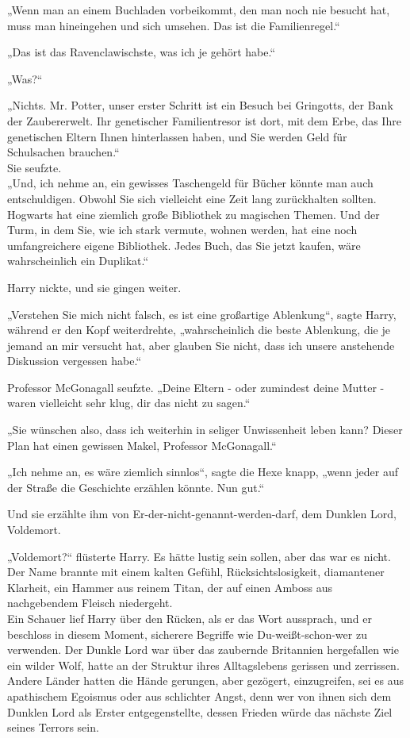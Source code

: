 {„Wenn man an einem Buchladen vorbeikommt, den man noch nie besucht hat, muss man hineingehen und sich umsehen. Das ist die Familienregel.“

„Das ist das Ravenclawischste, was ich je gehört habe.“

„Was?“

„Nichts. Mr. Potter, unser erster Schritt ist ein Besuch bei Gringotts, der Bank der Zaubererwelt. Ihr genetischer Familientresor ist dort, mit dem Erbe, das Ihre genetischen Eltern Ihnen hinterlassen haben, und Sie werden Geld für Schulsachen brauchen.“\\ Sie seufzte.\\ „Und, ich nehme an, ein gewisses Taschengeld für Bücher könnte man auch entschuldigen. Obwohl Sie sich vielleicht eine Zeit lang zurückhalten sollten. Hogwarts hat eine ziemlich große Bibliothek zu magischen Themen. Und der Turm, in dem Sie, wie ich stark vermute, wohnen werden, hat eine noch umfangreichere eigene Bibliothek. Jedes Buch, das Sie jetzt kaufen, wäre wahrscheinlich ein Duplikat.“

Harry nickte, und sie gingen weiter.

„Verstehen Sie mich nicht falsch, es ist eine großartige Ablenkung“, sagte Harry, während er den Kopf weiterdrehte, „wahrscheinlich die beste Ablenkung, die je jemand an mir versucht hat, aber glauben Sie nicht, dass ich unsere anstehende Diskussion vergessen habe.“

Professor McGonagall seufzte. „Deine Eltern - oder zumindest deine Mutter - waren vielleicht sehr klug, dir das nicht zu sagen.“

„Sie wünschen also, dass ich weiterhin in seliger Unwissenheit leben kann? Dieser Plan hat einen gewissen Makel, Professor McGonagall.“

„Ich nehme an, es wäre ziemlich sinnlos“, sagte die Hexe knapp, „wenn jeder auf der Straße die Geschichte erzählen könnte. Nun gut.“

Und sie erzählte ihm von Er-der-nicht-genannt-werden-darf, dem Dunklen Lord, Voldemort.

„Voldemort?“ flüsterte Harry. Es hätte lustig sein sollen, aber das war es nicht. Der Name brannte mit einem kalten Gefühl, Rücksichtslosigkeit, diamantener Klarheit, ein Hammer aus reinem Titan, der auf einen Amboss aus nachgebendem Fleisch niedergeht.\\ Ein Schauer lief Harry über den Rücken, als er das Wort aussprach, und er beschloss in diesem Moment, sicherere Begriffe wie Du-weißt-schon-wer zu verwenden. Der Dunkle Lord war über das zaubernde Britannien hergefallen wie ein wilder Wolf, hatte an der Struktur ihres Alltagslebens gerissen und zerrissen.\\ Andere Länder hatten die Hände gerungen, aber gezögert, einzugreifen, sei es aus apathischem Egoismus oder aus schlichter Angst, denn wer von ihnen sich dem Dunklen Lord als Erster entgegenstellte, dessen Frieden würde das nächste Ziel seines Terrors sein.

}
